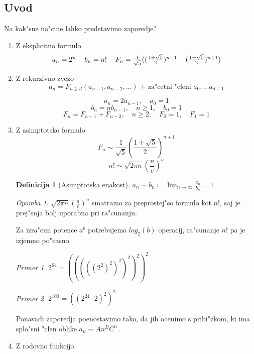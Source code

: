 \documentclass[a4paper,12pt]{article}
\theoremstyle{definition}
\newtheorem{defn}[counter]{Definicija}
\theoremstyle{remark}
\newtheorem*{ex}{Primer}
\newtheorem*{rem}{Opomba}
\begin{document}
\subsection{Uvod}
Na kak"sne na"cine lahko predstavimo zaporedje?
\begin{enumerate}
    \item Z eksplicitno formulo
    \[\begin{tabular}{c c c}
    $a_n = 2^n$ & $b_n = n!$ & $F_n = \frac{1}{\sqrt{5}}((\frac{1 + \sqrt{5}}{2})^{n + 1} - (\frac{1 - \sqrt{5}}{2})^{n + 1})$
    \end{tabular}\]
    \item Z rekurzivno zvezo
    \[a_n = F_{n \geqslant d} (a_{n - 1}, a_{n - 2}, ...)\text{ + za"cetni "cleni }a_0, ... a_{d - 1}\]
    
    \[a_n = 2a_{n-1}, \quad a_0 = 1\]
    \[b_n = nb_{n - 1}, \quad n \geqslant 1, \quad b_0 = 1\]
    \[F_n = F_{n - 1} + F_{n - 2}, \quad n \geqslant 2, \quad F_0 = 1, \quad F_1 = 1\]
    
    \item Z asimptotsko formulo
    \[F_n \sim \frac{1}{\sqrt{5}}(\frac{1 + \sqrt{5}}{2})^{n + 1}\]
    \[n! \sim \sqrt{2 \pi n}(\frac{n}{e})^n\]
    \begin{defn}[Asimptotska enakost]
    	$a_n \sim b_n \coloneqq \lim_{n \to \infty} \frac{a_n}{b_n} = 1$
    \end{defn}
    \begin{rem}
    	$\sqrt{2 \pi n}(\frac{n}{e})^n$ smatramo za preprostej"so formulo kot $n!$, saj je prej"snja bolj uporabna pri ra"cunanju.
    \end{rem}
	Za izra"cun potence $a^b$ potrebujemo $log_2(b)$ operacij, ra"cunanje $n!$ pa je izjemno po"casno.
	\begin{ex}
		$2^{64} = (((((2^2)^2)^2)^2)^2)^2$
	\end{ex}
	\begin{ex}
		$2^{100} = ((2^{24} \cdot 2)^2)^2$
	\end{ex}
    Ponavadi zaporedja poenostavimo tako, da jih ocenimo s pribi"zkom, ki ima splo"sni "clen oblike $a_n \sim A n^B C^n$.
    
    \item Z rodovno funkcijo
    

\end{enumerate}
\end{document}
